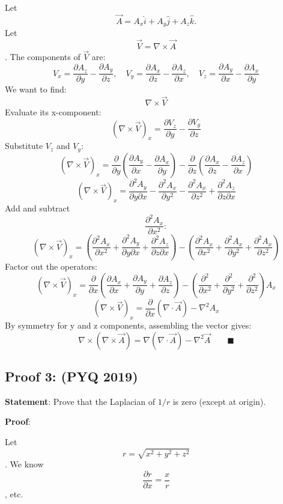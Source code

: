 \documentclass[
]{article}
\begin{document}
Let
\[
\vec{A} = A_x\hat{i} + A_y\hat{j} + A_z\hat{k}.
\]
Let
\[
\vec{V} = \nabla \times \vec{A}
\]
. The components of \(\vec{V}\) are:
\[
V_x = \frac{\partial A_z}{\partial y} - \frac{\partial A_y}{\partial z}, \quad V_y = \frac{\partial A_x}{\partial z} - \frac{\partial A_z}{\partial x}, \quad V_z = \frac{\partial A_y}{\partial x} - \frac{\partial A_x}{\partial y}
\]
We want to find:
\[
\nabla \times \vec{V}
\]
Evaluate its x-component:
\[
(\nabla \times \vec{V})_x = \frac{\partial V_z}{\partial y} - \frac{\partial V_y}{\partial z}
\]
Substitute \(V_z\) and \(V_y\):
\[
(\nabla \times \vec{V})_x = \frac{\partial}{\partial y}\left( \frac{\partial A_y}{\partial x} - \frac{\partial A_x}{\partial y} \right) - \frac{\partial}{\partial z}\left( \frac{\partial A_x}{\partial z} - \frac{\partial A_z}{\partial x} \right)
\]
\[
(\nabla \times \vec{V})_x = \frac{\partial^2 A_y}{\partial y \partial x} - \frac{\partial^2 A_x}{\partial y^2} - \frac{\partial^2 A_x}{\partial z^2} + \frac{\partial^2 A_z}{\partial z \partial x}
\]
Add and subtract
\[
\frac{\partial^2 A_x}{\partial x^2}:
\]
\[
(\nabla \times \vec{V})_x = \left( \frac{\partial^2 A_x}{\partial x^2} + \frac{\partial^2 A_y}{\partial y \partial x} + \frac{\partial^2 A_z}{\partial z \partial x} \right) - \left( \frac{\partial^2 A_x}{\partial x^2} + \frac{\partial^2 A_x}{\partial y^2} + \frac{\partial^2 A_x}{\partial z^2} \right)
\]
Factor out the operators:
\[
(\nabla \times \vec{V})_x = \frac{\partial}{\partial x}\left( \frac{\partial A_x}{\partial x} + \frac{\partial A_y}{\partial y} + \frac{\partial A_z}{\partial z} \right) - \left( \frac{\partial^2}{\partial x^2} + \frac{\partial^2}{\partial y^2} + \frac{\partial^2}{\partial z^2} \right)A_x
\]
\[
(\nabla \times \vec{V})_x = \frac{\partial}{\partial x}(\nabla \cdot \vec{A}) - \nabla^2 A_x
\]
By symmetry for y and z components, assembling the vector gives:
\[
\nabla \times (\nabla \times \vec{A}) = \nabla(\nabla \cdot \vec{A}) - \nabla^2\vec{A} \qquad \blacksquare
\]

\subsection{Proof 3: (PYQ 2019)}\label{proof-3-pyq-2019}

\textbf{Statement}: Prove that the Laplacian of \(1/r\) is zero (except
at origin).

\textbf{Proof}:

Let
\[
r = \sqrt{x^2 + y^2 + z^2}
\]
. We know
\[
\frac{\partial r}{\partial x} = \frac{x}{r}
\]
, etc.
\end{document}
